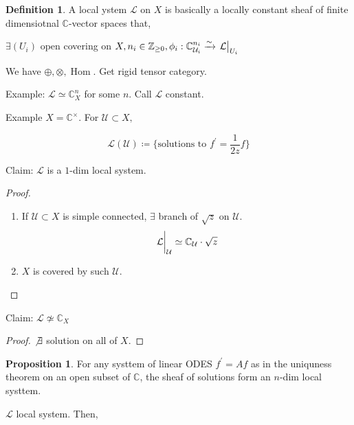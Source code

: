 \documentclass{article}
\theoremstyle{definition}
\newtheorem*{definition}{Definition}
\newtheorem{proposition}[theorem]{Proposition}
\begin{document}
    \begin{definition}
        A local ystem \(\mathcal{L}\) on \(X\) is basically a locally constant sheaf of finite dimensiotnal \(\mathbb{C}\)-vector spaces that,

        \(\exists (U_i)\) open covering on \(X, n_i \in \mathbb{Z}_{\geq 0}, \phi_i : \mathbb{C}_{\mathcal{U}_i}^{n_i} \xrightarrow{\sim} \eval{\mathcal{L}}_{U_i}\)

        We have \(\oplus , \otimes, \operatorname{Hom}\). Get rigid tensor category.
    \end{definition}

    Example: \(\mathcal{L} \simeq \mathbb{C}^n_X\) for some \(n\). Call \(\mathcal{L}\) constant.

    Example \(X = \mathbb{C} ^\times\). For \(\mathcal{U} \subset X,\)

    \[
        \mathcal{L}(\mathcal{U}) \coloneqq \{ \text{solutions to } f^{\prime} = \frac{1}{2z}f \} 
    \]

    Claim: \(\mathcal{L}\) is a \(1\)-dim local system.

    \begin{proof}
        \begin{enumerate}[label=\arabic*)]
            \item If \(\mathcal{U} \subset X\) is simple connected, \(\exists\) branch of \(\sqrt{z}\) on \(\mathcal{U}\).
            \[
                \eval{\mathcal{L}}_{\mathcal{U}} \simeq \mathbb{C}_{\mathcal{U}} \cdot \sqrt{z} 
            \]

            \item \(X\) is covered by such \(\mathcal{U}\).
        \end{enumerate} 
    \end{proof}

    Claim: \(\mathcal{L} \not\simeq \mathbb{C}_X\)

    \begin{proof}
        \(\not\exists\) solution on all of \(X\).
    \end{proof}

    \begin{proposition}
        For any systtem of linear ODES \(f^{\prime} = Af\) as in the uniquness theorem on an open subset of \(\mathbb{C}\), the sheaf of solutions form an \(n\)-dim local systtem.
    \end{proposition}

    \(\mathcal{L}\) local system. Then,
\end{document}

